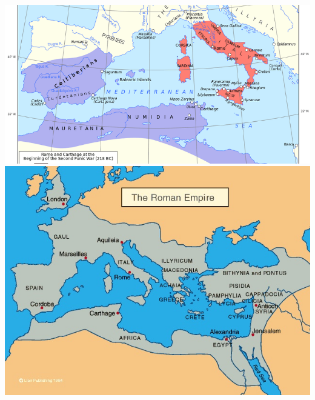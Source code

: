 \documentclass[10pt]{beamer}
\begin{document}
\begin{frame}[t]
\begin{columns}
		\begin{column}{0.4\textwidth}
			\begin{center}
				\includegraphics[width=1.0\textwidth]{figures/punic.png}\\
				\medskip
				\includegraphics[width=1.0\textwidth]{figures/roman_empire.jpg}\\
			\end{center}
		\end{column}
	\end{columns}

\end{frame}
\end{document}
